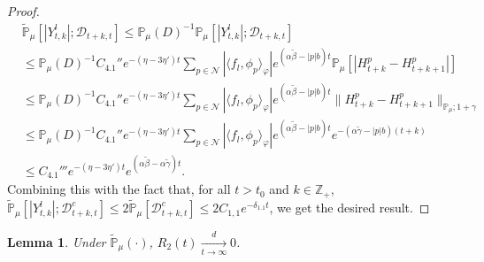 \documentclass[12pt,a4paper]{amsart}
\theoremstyle{plain}
\newtheorem{lem}[thm]{Lemma}
\theoremstyle{definition}
\numberwithin{equation}{section}
\begin{document}
\begin{proof}
\begin{align}
    & \widetilde{\mathbb P}_\mu[|Y^l_{t,k}|; \mathcal D_{t+k,t}]
      \leq \mathbb P_\mu(D)^{-1}\mathbb P_\mu[ |Y^l_{t,k}| ;\mathcal D_{t+k,t} ]
    \\ & \leq \mathbb P_{\mu}(D)^{-1} C_{4.1}'' e^{- (\eta - 3\eta') t}\sum_{p\in \mathcal {N}} |\langle f_l,\phi_p\rangle_\varphi|  e^{(\alpha \tilde \beta  -|p|b)t} \mathbb P_\mu[| H_{t+k}^p-H_{t+k+1}^p |]
    \\ & \leq \mathbb P_{\mu}(D)^{-1} C_{4.1}'' e^{- (\eta - 3\eta') t}\sum_{p\in \mathcal {N}} |\langle f_l,\phi_p\rangle_\varphi|  e^{(\alpha \tilde \beta  -|p|b)t} \| H_{t+k}^p-H_{t+k+1}^p \|_{\mathbb P_\mu; 1+\gamma}
    \\&\leq  \mathbb P_{\mu}(D)^{-1} C_{4.1}'' e^{- (\eta - 3\eta') t}\sum_{p\in \mathcal N} |\langle f_l,\phi_p\rangle_\varphi|  e^{(\alpha \tilde \beta  -|p|b)t} e^{-(\alpha \tilde \gamma - |p|b)(t+k)} \\
    &  \leq  C_{4.1}''' e^{- (\eta - 3\eta') t} e^{(\alpha \tilde \beta - \alpha \tilde \gamma)t}.
  \end{align}
 Combining this with the fact that, for all $t>t_0$ and $k\in \mathbb Z_+$,  $\mathbb{\widetilde{P}}_{\mu} [|Y^l_{t,k}| ; \mathcal{D}^c_{t+k,t} ]\leq 2\mathbb{\widetilde{P}}_{\mu} [ \mathcal{D}^c_{t+k,t} ]\leq 2 C_{1,1}e^{-\delta_{1.1}t}$, we get the desired result.
\end{proof}
\begin{lem}\label{lem: U2T}
Under $\mathbb{\widetilde{P}}_{\mu}(\cdot)$,
$R_2(t)\xrightarrow[t\to \infty]{d}0$.
\end{lem}
\end{document}
